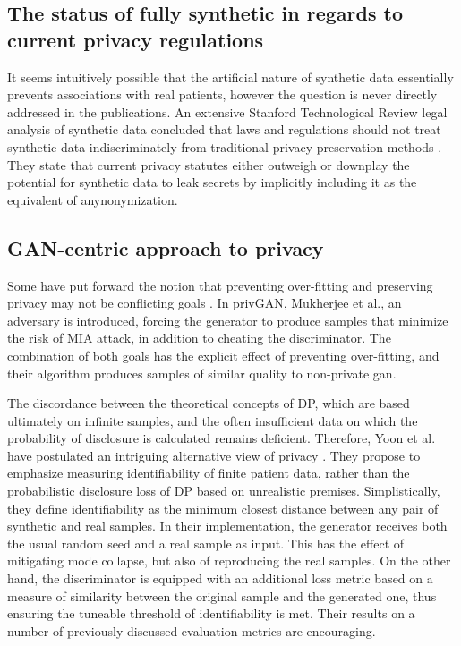 \subsection{The status of fully synthetic in regards to current privacy regulations}
It seems intuitively possible that the artificial nature of synthetic data essentially prevents associations with real patients, however the question is never directly addressed in the publications. An extensive Stanford Technological Review legal analysis of synthetic data concluded that laws and regulations should not treat synthetic data indiscriminately from traditional privacy preservation methods \cite{bellovin2019privacy}. They state that current privacy statutes either outweigh or downplay the potential for synthetic data to leak secrets by implicitly including it as the equivalent of anynonymization. 
\subsection{GAN-centric approach to privacy}
Some have put forward the notion that preventing over-fitting and preserving privacy may not be conflicting goals \cite{Wu2019-ui,Mukherjee2019-vu}. In privGAN, Mukherjee et al., an adversary is introduced, forcing the generator to produce samples that minimize the risk of MIA attack, in addition to cheating the discriminator. The combination of both goals has the explicit effect of preventing over-fitting, and their algorithm produces samples of similar quality to non-private \gls{gan}.\par
The discordance between the theoretical concepts of DP, which are  based ultimately on infinite samples, and the often insufficient data on which the probability of disclosure is calculated remains deficient. Therefore, Yoon et al. have postulated an intriguing alternative view of privacy \cite{Yoon2020-anon}. They propose to emphasize measuring identifiability of finite patient data, rather than the probabilistic disclosure loss of DP based on unrealistic premises. Simplistically, they define identifiability as the minimum closest distance between any pair of synthetic and real samples. In their implementation, the generator receives both the usual random seed and a real sample as input. This has the effect of mitigating mode collapse, but also of reproducing the real samples. On the other hand, the discriminator is equipped with an additional loss metric based on a measure of similarity between the original sample and the generated one, thus ensuring the tuneable threshold of identifiability is met. Their results on a number of previously discussed evaluation metrics are encouraging.\par
